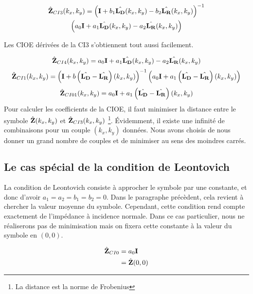     \begin{multline}
        \hat{\mathbf{Z}}_{CI3}(k_x,k_y) = \left(\mathbf{I} + b_1 \hat{\mathbf{L_D}}(k_x,k_y) - b_2 \hat{\mathbf{L_R}}(k_x,k_y) \right)^{-1}
        \\
        \left(a_0 \mathbf{I} + a_1 \hat{\mathbf{L_D}}(k_x,k_y) - a_2 \hat{\mathbf{L_R}}(k_x,k_y)\right)
    \end{multline}

    Les CIOE dérivées de la CI3 s'obtiennent tout aussi facilement.

    \begin{equation}
        \hat{\mathbf{Z}}_{CI4}(k_x,k_y) = a_0 \mathbf{I} + a_1 \hat{\mathbf{L_D}}(k_x,k_y) - a_2 \hat{\mathbf{L_R}}(k_x,k_y)
    \end{equation}
    \begin{equation}
        \hat{\mathbf{Z}}_{CI1}(k_x,k_y) =  \left(\mathbf{I} + b \left(\hat{\mathbf{L_D}} - \hat{\mathbf{L_R}}\right)(k_x,k_y) \right)^{-1}\left(a_0\mathbf{I} + a_1 \left(\hat{\mathbf{L_D}} - \hat{\mathbf{L_R}}\right)(k_x,k_y) \right)
    \end{equation}
    \begin{equation}
        \hat{\mathbf{Z}}_{CI01}(k_x,k_y) =  a_0\mathbf{I} + a_1 \left(\hat{\mathbf{L_D}} - \hat{\mathbf{L_R}}\right)(k_x,k_y)
    \end{equation}
    Pour calculer les coefficients de la CIOE, il faut minimiser la distance entre le symbole \(\hat{\mathbf{Z}}(k_x,k_y)\) et \(\hat{\mathbf{Z}}_{CI3}(k_x,k_y)\) \footnote{La distance est la norme de Frobenius}. Évidemment, il existe une infinité de combinaisons pour un couple \((k_x,k_y)\) données. Nous avons choisis de nous donner un grand nombre de couples et de minimiser au sens des moindres carrés.

  \subsection{Le cas spécial de la condition de Leontovich}

    La condition de Leontovich consiste à approcher le symbole par une constante, et donc d'avoir \(a_1=a_2=b_1=b_2=0\). Dans le paragraphe précèdent, cela revient à chercher la valeur moyenne du symbole. Cependant, cette condition rend compte exactement de l'impédance à incidence normale. Dans ce cas particulier, nous ne réaliserons pas de minimisation mais on fixera cette constante à la valeur du symbole en \((0,0)\).

    \begin{align}
      \hat{\mathbf{Z}}_{CI0} & = a_0\mathbf{I} 
      \\
      &= \hat{\mathbf{Z}}(0,0)
    \end{align}

